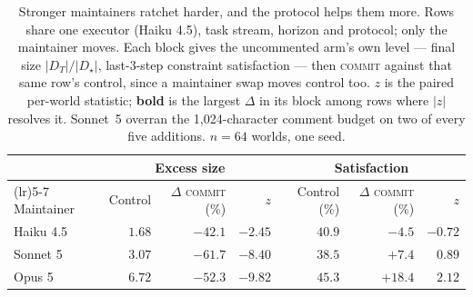 \begin{table}[t]
  \centering\small
  \begin{tabularx}{\textwidth}{@{}>{\raggedright\arraybackslash}Xrrrrrr@{}}
    \toprule
    & \multicolumn{3}{c}{Excess size} & \multicolumn{3}{c}{Satisfaction} \\
    \cmidrule(lr){2-4} \cmidrule(lr){5-7}
    Maintainer & Control & $\Delta$ \textsc{commit} (\%) & $z$ & Control (\%) & $\Delta$ \textsc{commit} (\%) & $z$ \\
    \midrule
    Haiku 4.5 & $1.68$ & $-42.1$ & $-2.45$ & $40.9$ & $-4.5$ & $-0.72$ \\
    Sonnet 5 & $3.07$ & $\mathbf{-61.7}$ & $-8.40$ & $38.5$ & $+7.4$ & $0.89$ \\
    Opus 5 & $6.72$ & $-52.3$ & $-9.82$ & $45.3$ & $\mathbf{+18.4}$ & $2.12$ \\
    \bottomrule
  \end{tabularx}
  \caption{
    Stronger maintainers ratchet harder, and the protocol helps them more. Rows
    share one executor (Haiku 4.5), task stream, horizon and protocol; only the maintainer moves.
    Each block gives the uncommented arm's own level --- final size $|D_T|/|D_\star|$,
    last-3-step constraint satisfaction --- then \textsc{commit} against that same row's control,
    since a maintainer swap moves control too. $z$ is the paired per-world statistic;
    \textbf{bold} is the largest $\Delta$ in its block among rows where $|z|$ resolves it.
    Sonnet~5 overran the 1{,}024-character comment budget on two of every five additions.
    $n{=}64$ worlds, one seed.
  }
  \label{tab:capacity}
\end{table}
